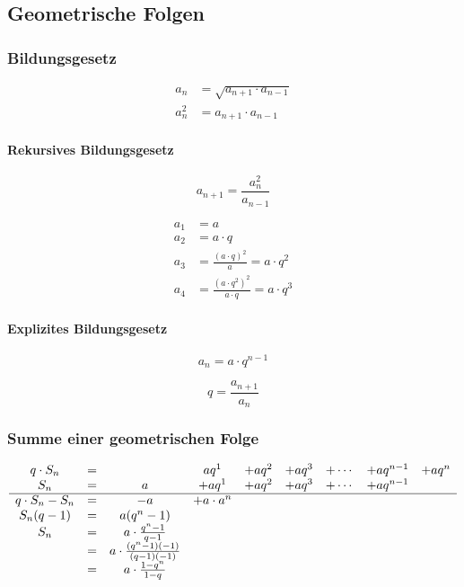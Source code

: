 \subsection{Geometrische Folgen}

\subsubsection{Bildungsgesetz}

\begin{align*}
    a_n &= \sqrt{a_{n+1} \cdot a_{n-1}} \\
    a_n^2 &= a_{n+1} \cdot a_{n-1}
\end{align*}

\begin{gesetz}
    \paragraph{Rekursives Bildungsgesetz}
    \[
        a_{n+1} = \frac{a_n^2}{a_{n-1}}  
    \]
\end{gesetz}

\begin{align*}
    a_1 &= a \\
    a_2 &= a \cdot q \\
    a_3 &= \frac{{(a \cdot q)}^2}{a} = a \cdot q^2 \\
    a_4 &= \frac{{(a \cdot q^2)}^2}{a \cdot q} = a \cdot q^3
\end{align*}

\begin{gesetz}
    \paragraph{Explizites Bildungsgesetz}
    \[
        a_n = a \cdot q^{n-1}  
    \]
\end{gesetz}

\[
    q = \frac{a_{n+1}}{a_n}
\]

\subsubsection{Summe einer geometrischen Folge}

\[
    \begin{array}{ccccccccc}
        q \cdot S_n &=& & a q^1 &+ a q^2 &+ a q^3 &+ \cdots &+ a q^{n-1} &+ a q^n \\
        S_n &=& a &+ a q^1 &+ a  q^2 &+ a q^3 &+ \cdots &+ a q^{n-1} & \\
        \cline{1-9}
        q \cdot S_n - S_n &=& -a &+ a \cdot a^n &&&&& \\
        S_n(q-1) &=& a(q^n -1) &&&&&& \\
        S_n &=& a \cdot \frac{q^n - 1}{q - 1} &&&&&& \\
        &=& a \cdot \frac{(q^n - 1)(-1)}{(q - 1)(-1)} &&&&&& \\
        &=& a \cdot \frac{1- q^n}{1 - q} &&&&&& \\
    \end{array}  
\]

